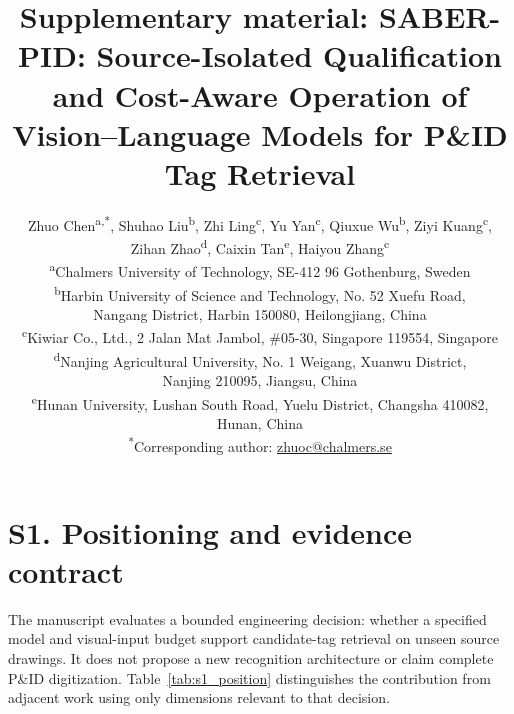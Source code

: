 \documentclass[11pt]{article}
\title{Supplementary material: SABER-PID: Source-Isolated Qualification and Cost-Aware Operation of Vision--Language Models for P\&ID Tag Retrieval}
\author{%
Zhuo Chen\textsuperscript{a,*}, Shuhao Liu\textsuperscript{b},
Zhi Ling\textsuperscript{c}, Yu Yan\textsuperscript{c},
Qiuxue Wu\textsuperscript{b}, Ziyi Kuang\textsuperscript{c},\\
Zihan Zhao\textsuperscript{d}, Caixin Tan\textsuperscript{e},
Haiyou Zhang\textsuperscript{c}\\[0.4em]
\footnotesize \textsuperscript{a}Chalmers University of Technology,
SE-412 96 Gothenburg, Sweden\\
\footnotesize \textsuperscript{b}Harbin University of Science and Technology, No. 52 Xuefu Road,\\
Nangang District, Harbin 150080, Heilongjiang, China\\
\footnotesize \textsuperscript{c}Kiwiar Co., Ltd., 2 Jalan Mat Jambol,
\#05-30, Singapore 119554, Singapore\\
\footnotesize \textsuperscript{d}Nanjing Agricultural University, No. 1 Weigang, Xuanwu District,\\
Nanjing 210095, Jiangsu, China\\
\footnotesize \textsuperscript{e}Hunan University, Lushan South Road, Yuelu District,
Changsha 410082, Hunan, China\\[0.25em]
\footnotesize \textsuperscript{*}Corresponding author:
\href{mailto:zhuoc@chalmers.se}{zhuoc@chalmers.se}%
}
\date{}
\begin{document}
\renewcommand{\thetable}{S\arabic{table}}
\renewcommand{\thefigure}{S\arabic{figure}}
\maketitle

\section*{S1. Positioning and evidence contract}

The manuscript evaluates a bounded engineering decision: whether a specified
model and visual-input budget support candidate-tag retrieval on unseen source
drawings. It does not propose a new recognition architecture or claim complete
P\&ID digitization. Table~\ref{tab:s1_position} distinguishes the contribution from adjacent
work using only dimensions relevant to that decision.
\end{document}
